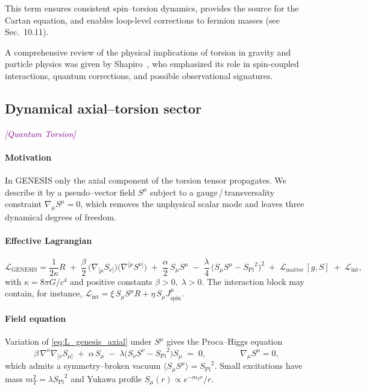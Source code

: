 \documentclass{article}
\newcommand{\Splanck}{\ensuremath{S_{\mathrm{Pl}}}}
\newcommand{\quantumtag}{\textcolor{purple}{\textit{[Quantum Torsion]}}}
\begin{document}
This term ensures consistent spin–torsion dynamics, provides the source for the Cartan equation, and enables loop-level corrections to fermion masses (see Sec.~10.11).

A comprehensive review of the physical implications of torsion in gravity and particle physics was given by Shapiro~\cite{shapiro2002}, who emphasized its role in spin-coupled interactions, quantum corrections, and possible observational signatures.


\subsection{Dynamical axial--torsion sector}
\label{sec:dynamic-lagrangian}
\label{sec:torsion-dynamics}
\quantumtag


\paragraph{Motivation}
In GENESIS only the axial component of the torsion tensor propagates.  We describe it
by a pseudo--vector field \(S^\mu\) subject to a gauge\,/\,transversality constraint
\(\nabla_\mu S^\mu = 0\), which removes the unphysical scalar mode and leaves three
dynamical degrees of freedom.

\paragraph{Effective Lagrangian}
\begin{equation}
\label{eq:L_genesis_axial}
\mathcal{L}_{\text{GENESIS}} =
\frac{1}{2\kappa} R
\;+\;
\frac{\beta}{2}\,
\bigl(\nabla_{[\mu} S_{\nu]}\bigr)
\bigl(\nabla^{[\mu} S^{\nu]}\bigr)
\;+\;
\frac{\alpha}{2}\,S_\mu S^\mu
\;-\;
\frac{\lambda}{4}\,\bigl(S_\mu S^\mu - \Splanck^{2}\bigr)^{2}
\;+\;
\mathcal{L}_{\text{matter}}\,[g,S]
\;+\;
\mathcal{L}_{\text{int}},
\end{equation}
with
\(\kappa = 8\pi G/c^{4}\) and positive constants \(\beta>0,\;\lambda>0\).
The interaction block may contain, for instance,
\(\mathcal{L}_{\text{int}} = \xi\,S_\mu S^\mu R + \eta\,S_\mu J_{\text{spin}}^{\mu}\).

\paragraph{Field equation}
Variation of \eqref{eq:L_genesis_axial} under \(S^\mu\) gives the Proca--Higgs equation
\begin{equation}
\label{eq:EOM_axial}
\beta\,\nabla^{\nu}\nabla_{[\nu} S_{\mu]}
\;+\;
\alpha\,S_\mu
\;-\;
\lambda\bigl(S_\nu S^\nu - \Splanck^{2}\bigr) S_\mu
\;=\;0,
\qquad\qquad
\nabla_\mu S^\mu = 0,
\end{equation}
which admits a symmetry--broken vacuum
\(\langle S_\mu S^\mu\rangle = \Splanck^{2}\).
Small excitations have mass
\(m_{T}^{2} = \lambda \Splanck^{2}\)
and Yukawa profile
\(S_\mu(r)\propto e^{-m_T r}/r\).
\end{document}
